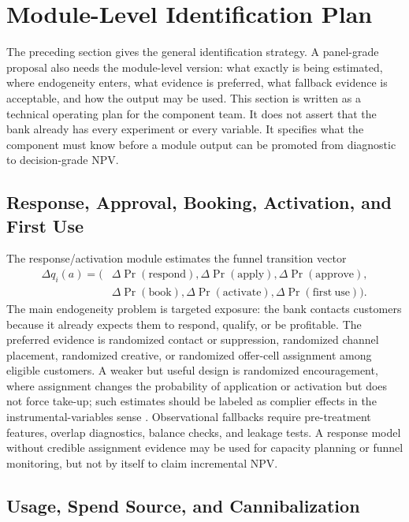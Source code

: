 \documentclass[11pt]{article}
\newcommand{\1}{\mathbf{1}}
\begin{document}
\section{Module-Level Identification Plan}
\label{sec:module-identification-plan}

The preceding section gives the general identification strategy. A panel-grade
proposal also needs the module-level version: what exactly is being estimated,
where endogeneity enters, what evidence is preferred, what fallback evidence
is acceptable, and how the output may be used. This section is written as a
technical operating plan for the component team. It does not assert that the
bank already has every experiment or every variable. It specifies what the
component must know before a module output can be promoted from diagnostic to
decision-grade NPV.

\subsection*{Response, Approval, Booking, Activation, and First Use}

The response/activation module estimates the funnel transition vector
\begin{align}
  \Delta q_i(a)
  =
  \big(&
    \Delta\Pr(\mathrm{respond}),
    \Delta\Pr(\mathrm{apply}),
    \Delta\Pr(\mathrm{approve}), \nonumber\\
  &
    \Delta\Pr(\mathrm{book}),
    \Delta\Pr(\mathrm{activate}),
    \Delta\Pr(\mathrm{first\ use})
  \big).
  \label{eq:funnel-transition-vector}
\end{align}
The main endogeneity problem is targeted exposure: the bank contacts customers
because it already expects them to respond, qualify, or be profitable. The
preferred evidence is randomized contact or suppression, randomized channel
placement, randomized creative, or randomized offer-cell assignment among
eligible customers. A weaker but useful design is randomized encouragement,
where assignment changes the probability of application or activation but does
not force take-up; such estimates should be labeled as complier effects in the
instrumental-variables sense \citep{angristimbensrubin1996iv}. Observational
fallbacks require pre-treatment features, overlap diagnostics, balance checks,
and leakage tests. A response model without credible assignment evidence may
be used for capacity planning or funnel monitoring, but not by itself to claim
incremental NPV.

\subsection*{Usage, Spend Source, and Cannibalization}
\end{document}

